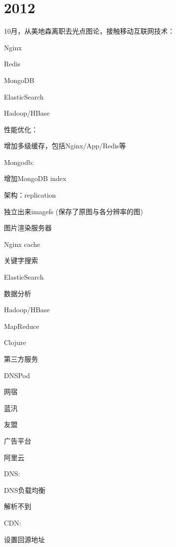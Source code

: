 \chapter{2012}

10月，从美地森离职去光点图论，接触移动互联网技术：

\begin{enumbox}
\item Nginx
\item Redis
\item MongoDB
\item ElasticSearch
\item Hadoop/HBase
\end{enumbox}

性能优化：
\begin{enumbox}
\item 增加多级缓存，包括Nginx/App/Redis等
\end{enumbox}

Mongodb:
\begin{enumbox}
\item 增加MongoDB index
\item 架构：replication
\item 独立出来imagefs (保存了原图与各分辨率的图)
\item 图片渲染服务器
\item Nginx cache
\end{enumbox}

关键字搜索
\begin{enumbox}
\item ElasticSearch
\end{enumbox}

数据分析
\begin{enumbox}
\item Hadoop/HBase
\item MapReduce
\item Clojure
\end{enumbox}

第三方服务
\begin{enumbox}
\item DNSPod
\item 网宿
\item 蓝汛
\item 友盟
\item 广告平台
\item 阿里云
\end{enumbox}

DNS:
\begin{enumbox}
\item DNS负载均衡
\item 解析不到
\end{enumbox}

CDN:
\begin{enumbox}
\item 设置回源地址
\end{enumbox}

